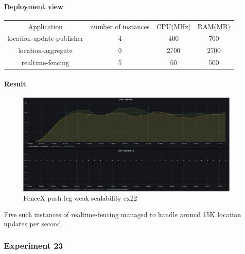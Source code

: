 \documentclass[a4]{report}
\begin{document}
        \paragraph{Deployment view}
        \begin{center}
            \begin{tabular}{ c c c c }
                Application               & number of instances & CPU(MHz) & RAM(MB) \\
                location-update-publisher & 4                   & 400      & 700     \\
                location-aggregate        & 0                   & 2700     & 2700    \\
                realtime-fencing          & 5                   & 60       & 500     \\
            \end{tabular}
        \end{center}

        \paragraph{Result}
        \begin{figure}[ht]
            \caption{FenceX push leg weak scalability ex22}
            \label{fig:ex22}
            \includegraphics[scale=0.4]{images/evaluation/ex22-benchmarking-ongoing-1per2sec.png}
        \end{figure}
        Five such instances of realtime-fencing managed to handle around 15K location updates per second.

        \subsubsection{Experiment 23}
\end{document}
